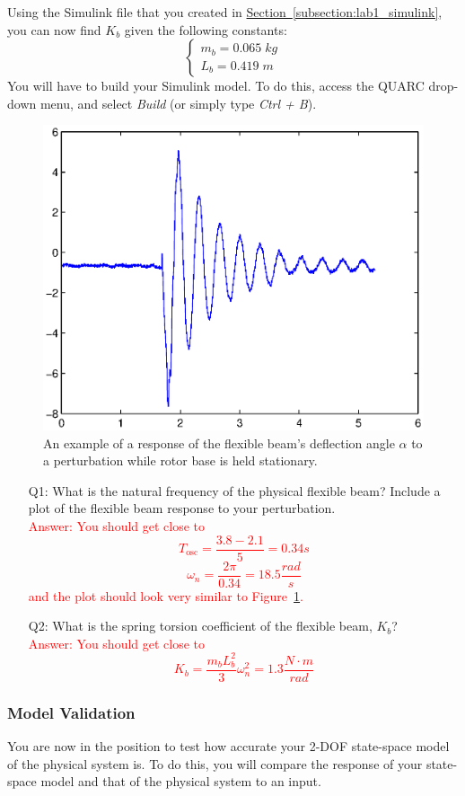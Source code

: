 \documentclass[12pt]{report}
\newcommand\drew[1]{\textcolor{red}{#1}}
\begin{document}
Using the Simulink file that you created in \hyperref[subsection:lab1_simulink]{Section~\ref{subsection:lab1_simulink}}, you can now find $K_b$ given the following constants:
\[
    \begin{cases}
        m_b = 0.065 \; kg \\
        L_b = 0.419 \; m
    \end{cases}
\]
You will have to build your Simulink model. To do this, access the QUARC drop-down menu, and select \emph{Build} (or simply type \emph{Ctrl + B}).
\begin{figure}[htb!]
    \centering
    \includegraphics[width=.5\linewidth]{eps/lab_1/perturb.eps}
    \caption{An example of a response of the flexible beam's deflection angle $\alpha$ to a perturbation while rotor base is held stationary.}
    \label{fig:lab1_perturbation_response}
\end{figure}
\begin{enumerate}[Questions]
    \item[Q1:] What is the natural frequency of the physical flexible beam? Include a plot of the flexible beam response to your perturbation.\\
          \drew{Answer: You should get close to
              \[
                  T_\text{osc} = \frac{3.8-2.1}{5} = 0.34 s
              \]
              \[
                  \omega_n = \frac{2\pi}{0.34} = 18.5 \frac{rad}{s}
              \]
              and the plot should look very similar to Figure~\ref{fig:lab1_perturbation_response}.
          }
    \item[Q2:] What is the spring torsion coefficient of the flexible beam, $K_b$?\\
          \drew{Answer: You should get close to
              \[
                  K_b = \frac{m_b L_{b}^2}{3} \omega_{n}^2 = 1.3 \frac{N \cdot m}{rad}
              \]
          }
\end{enumerate}

\subsubsection{Model Validation}\label{subsubsection:lab1_modelvalidation}
You are now in the position to test how accurate your 2-DOF state-space model of the physical system is. To do this, you will compare the response of your state-space model and that of the physical system to an input.
\end{document}
